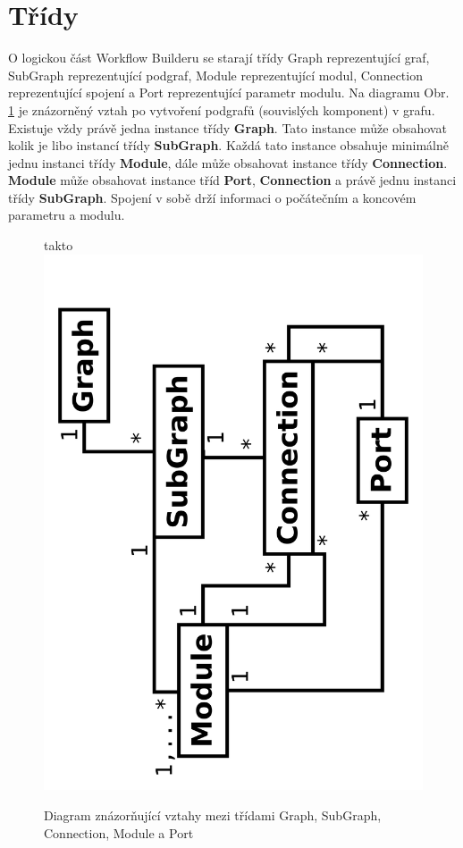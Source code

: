 \newpage
\section{Třídy}

O logickou část Workflow Builderu se starají třídy Graph reprezentující graf, SubGraph reprezentující podgraf, Module reprezentující modul, Connection reprezentující spojení a Port reprezentující parametr modulu. Na diagramu Obr. \ref{logClass} je znázorněný vztah po vytvoření podgrafů (souvislých komponent) v grafu. Existuje vždy právě jedna instance třídy \textbf{Graph}. Tato instance může obsahovat kolik je libo instancí třídy \textbf{SubGraph}. Každá tato instance obsahuje minimálně jednu instanci třídy \textbf{Module}, dále může obsahovat instance třídy \textbf{Connection}. \textbf{Module} může obsahovat instance tříd \textbf{Port}, \textbf{Connection} a právě jednu instanci třídy \textbf{SubGraph}. Spojení v sobě drží informaci o počátečním a koncovém parametru a modulu.

\begin{figure}[h]
	\begin{center}takto
		\includegraphics[scale=0.05,angle=-90]{pictures/wf/logClass.pdf}
		\caption{Diagram znázorňující vztahy mezi třídami Graph, SubGraph, Connection, Module a Port}
	  	\label{logClass}
	\end{center}
\end{figure}

